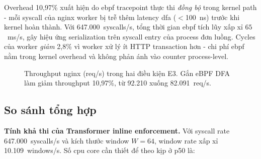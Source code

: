 \documentclass[../main.tex]{subfiles}
\begin{document}
Overhead 10,97\% xuất hiện do \gls{ebpf} tracepoint thực thi \emph{đồng bộ}
trong kernel path - mỗi \gls{syscall} của nginx worker bị trễ thêm latency
\gls{dfa} ($<$100~ns) trước khi kernel hoàn thành. Với 647.000~syscalls/s,
tổng thời gian \gls{ebpf} tích lũy xấp xỉ $65$~ms/s, gây hiệu ứng
serialization trên \gls{syscall} entry của process đơn luồng. Cycles của
worker \emph{giảm} 2,8\% vì worker xử lý ít HTTP transaction hơn -
chi phí \gls{ebpf} nằm trong kernel overhead và không phản ánh vào counter
process-level.

\begin{figure}[h!]
  \centering
  \caption{Throughput nginx (req/s) trong hai điều kiện E3. Gắn eBPF DFA
  làm giảm throughput 10,97\%, từ 92.210 xuống 82.091~req/s.}
  \label{fig:p4_e3_throughput}
\end{figure}

\subsection{So sánh tổng hợp}
\label{subsec:p4_comparison}

\textbf{Tính khả thi của Transformer inline enforcement.}
Với \gls{syscall} rate 647.000~syscalls/s và kích thước window $W=64$, window
rate xấp xỉ 10.109~windows/s. Số \gls{cpu} core cần thiết để theo kịp ở p50
là:
\end{document}
